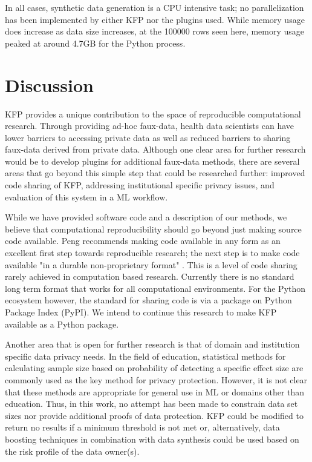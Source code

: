 \documentclass{amia}
\begin{document}
In all cases, synthetic data generation is a CPU intensive task; no parallelization has been implemented by either KFP nor the plugins used. While memory usage does increase as data size increases, at the 100000 rows seen here, memory usage peaked at around 4.7GB for the Python process.

\section{Discussion}

KFP provides a unique contribution to the space of reproducible computational research. Through providing ad-hoc faux-data, health data scientists can have lower barriers to accessing private data as well as reduced barriers to sharing faux-data derived from private data. Although one clear area for further research would be to develop plugins for additional faux-data methods, there are several areas that go beyond this simple step that could be researched further: improved code sharing of KFP, addressing institutional specific privacy issues, and evaluation of this system in a ML workflow.

While we have provided software code and a description of our methods, we believe that computational reproducibility should go beyond just making source code available. Peng recommends making code available in any form as an excellent first step towards reproducible research; the next step is to make code available "in a durable non-proprietary format" \cite{peng_reproducible_2011}. This is a level of code sharing rarely achieved in computation based research. Currently there is no standard long term format that works for all computational environments. For the Python ecosystem however, the standard for sharing code is via a package on Python Package Index (PyPI). We intend to continue this research to make KFP available as a Python package.

Another area that is open for further research is that of domain and institution specific data privacy needs. In the field of education, statistical methods for calculating sample size based on probability of detecting a specific effect size are commonly used \cite{naep_2009} as the key method for privacy protection. However, it is not clear that these methods are appropriate for general use in ML or domains other than education. Thus, in this work, no attempt has been made to constrain data set sizes nor provide additional proofs of data protection. KFP could be modified to return no results if a minimum threshold is not met or, alternatively, data boosting techniques in combination with data synthesis could be used based on the risk profile of the data owner(s).
\end{document}
